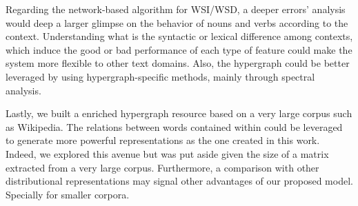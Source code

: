 Regarding the network-based algorithm for WSI/WSD, a deeper errors' analysis would deep a larger glimpse on the behavior of nouns and verbs according to the context. Understanding what is the syntactic or lexical difference among contexts, which induce the good or bad performance of each type of feature could make the system more flexible to other text domains. Also, the hypergraph could be better leveraged by using hypergraph-specific methods, mainly through spectral analysis.

Lastly, we built a enriched hypergraph resource based on a very large corpus such as Wikipedia. The relations between words contained within could be leveraged to generate more powerful representations as the one created in this work. Indeed, we explored this avenue but was put aside given the size of a matrix extracted from a very large corpus. Furthermore, a comparison with other distributional representations may signal other advantages of our proposed model. Specially for smaller corpora. 

